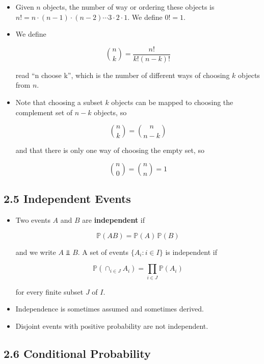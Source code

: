 \begin{itemize}
\item
  Given \(n\) objects, the number of way or ordering these objects is
  \(n! = n \cdot (n - 1) \cdot (n - 2) \cdots 3 \cdot 2 \cdot 1\). We
  define \(0! = 1\).
\item
  We define

  \[ \binom{n}{k} = \frac{n!}{k! (n - k)!} \]

  read ``n choose k'', which is the number of different ways of choosing
  \(k\) objects from \(n\).
\item
  Note that choosing a subset \(k\) objects can be mapped to choosing
  the complement set of \(n - k\) objects, so

  \[ \binom{n}{k} = \binom{n}{n - k} \]

  and that there is only one way of choosing the empty set, so

  \[ \binom{n}{0} = \binom{n}{n} = 1\]
\end{itemize}

\subsection*{2.5 Independent Events}\label{independent:events}

\begin{itemize}
\item
  Two events \(A\) and \(B\) are \textbf{independent} if

  \[ \mathbb{P}(AB) = \mathbb{P}(A) \, \mathbb{P}(B) \]

  and we write \(A \text{ ⫫ } B\). A set of events
  \(\{ A_{i} : i \in I \}\) is independent if

  \[ \mathbb{P} \left( \cap_{i \in J} A_{i} \right) = \prod_{i \in J} \mathbb{P}(A_{i}) \]

  for every finite subset \(J\) of \(I\).
\item
  Independence is sometimes assumed and sometimes derived.
\item
  Disjoint events with positive probability are not independent.
\end{itemize}

\subsection*{2.6 Conditional Probability}\label{conditional-probability}


